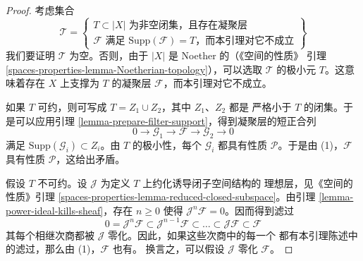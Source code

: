 \begin{proof}
考虑集合
$$
\mathcal{T} =
\left\{
\begin{matrix}
T \subset |X|
\text{ 为非空闭集，且存在凝聚层 } \\
\mathcal{F}
\text{ 满足 }
\text{Supp}(\mathcal{F}) = T
\text{，而本引理对它不成立}
\end{matrix}
\right\}
$$
我们要证明 $\mathcal{T}$ 为空。否则，由于 $|X|$ 是 Noether 的（《空间的性质》
引理 \ref{spaces-properties-lemma-Noetherian-topology}），可以选取
$\mathcal{T}$ 的极小元 $T$。这意味着存在 $X$ 上支撑为 $T$ 的凝聚层
$\mathcal{F}$，而本引理对它不成立。

\medskip\noindent
如果 $T$ 可约，则可写成 $T = Z_1 \cup Z_2$，其中 $Z_1$、$Z_2$ 都是
严格小于 $T$ 的闭集。于是可以应用引理
\ref{lemma-prepare-filter-support}，得到凝聚层的短正合列
$$
0 \to
\mathcal{G}_1 \to
\mathcal{F} \to
\mathcal{G}_2 \to 0
$$
满足 $\text{Supp}(\mathcal{G}_i) \subset Z_i$。由 $T$ 的极小性，每个
$\mathcal{G}_i$ 都具有性质 $\mathcal{P}$。于是由 (1)，$\mathcal{F}$
具有性质 $\mathcal{P}$，这给出矛盾。

\medskip\noindent
假设 $T$ 不可约。设 $\mathcal{J}$ 为定义 $T$ 上约化诱导闭子空间结构的
理想层，见《空间的性质》引理
\ref{spaces-properties-lemma-reduced-closed-subspace}。由引理
\ref{lemma-power-ideal-kills-sheaf}，存在 $n \geq 0$ 使得
$\mathcal{J}^n\mathcal{F} = 0$。因而得到滤过
$$
0 = \mathcal{J}^n\mathcal{F} \subset \mathcal{J}^{n - 1}\mathcal{F}
\subset \ldots \subset \mathcal{J}\mathcal{F} \subset \mathcal{F}
$$
其每个相继次商都被 $\mathcal{J}$ 零化。因此，如果这些次商中的每一个
都有本引理陈述中的滤过，那么由 (1)，$\mathcal{F}$ 也有。%
换言之，可以假设 $\mathcal{J}$ 零化 $\mathcal{F}$。


\end{proof}
